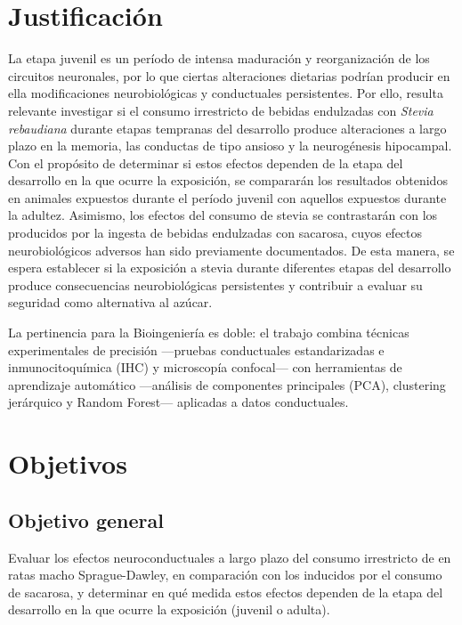 \section{Justificación}\label{sec:justificacion}

La etapa juvenil es un período de intensa maduración y reorganización de los circuitos neuronales, por lo que ciertas alteraciones dietarias podrían producir en ella modificaciones neurobiológicas y conductuales persistentes. Por ello, resulta relevante investigar si el consumo irrestricto de bebidas endulzadas con \textit{Stevia rebaudiana} durante etapas tempranas del desarrollo produce alteraciones a largo plazo en la memoria, las conductas de tipo ansioso y la neurogénesis hipocampal. Con el propósito de determinar si estos efectos dependen de la etapa del desarrollo en la que ocurre la exposición, se compararán los resultados obtenidos en animales expuestos durante el período juvenil con aquellos expuestos durante la adultez. Asimismo, los efectos del consumo de stevia se contrastarán con los producidos por la ingesta de bebidas endulzadas con sacarosa, cuyos efectos neurobiológicos adversos han sido previamente documentados. De esta manera, se espera establecer si la exposición a stevia durante diferentes etapas del desarrollo produce consecuencias neurobiológicas persistentes y contribuir a evaluar su seguridad como alternativa al azúcar.

La pertinencia para la Bioingeniería es doble: el trabajo combina técnicas experimentales de precisión ---pruebas conductuales estandarizadas e inmunocitoquímica (IHC) y microscopía confocal--- con herramientas de aprendizaje automático ---análisis de componentes principales (PCA), clustering jerárquico y Random Forest--- aplicadas a datos conductuales.

\section{Objetivos}\label{sec:objetivos}

\subsection{Objetivo general}

Evaluar los efectos neuroconductuales a largo plazo del consumo irrestricto de \stevia{} en ratas macho Sprague-Dawley, en comparación con los inducidos por el consumo de sacarosa, y determinar en qué medida estos efectos dependen de la etapa del desarrollo en la que ocurre la exposición (juvenil o adulta).

